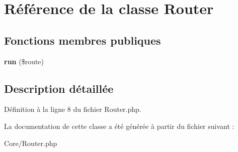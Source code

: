 \hypertarget{class_core_1_1_router}{}\section{Référence de la classe Router}
\label{class_core_1_1_router}
\subsection*{Fonctions membres publiques}
\begin{DoxyCompactItemize}
\item 
{\bfseries run} (\$route)\hypertarget{class_core_1_1_router_a34a4b81dc741f764040f61c7d45e82ad}{}\label{class_core_1_1_router_a34a4b81dc741f764040f61c7d45e82ad}

\end{DoxyCompactItemize}


\subsection{Description détaillée}


Définition à la ligne 8 du fichier Router.\+php.



La documentation de cette classe a été générée à partir du fichier suivant \+:\begin{DoxyCompactItemize}
\item 
Core/Router.\+php\end{DoxyCompactItemize}
